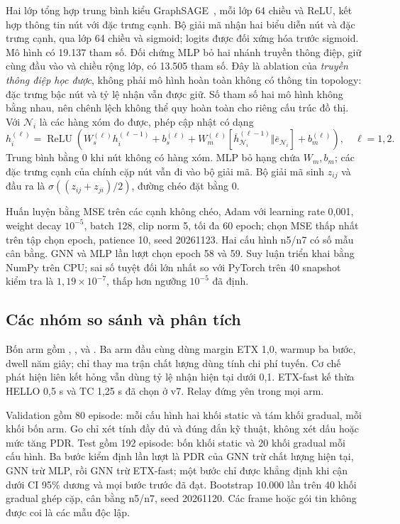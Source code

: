 Hai lớp tổng hợp trung bình kiểu GraphSAGE~\cite{graphsage}, mỗi lớp 64 chiều
và ReLU, kết hợp thông tin nút với đặc trưng cạnh. Bộ giải mã nhận hai biểu
diễn nút và đặc trưng cạnh, qua lớp 64 chiều và sigmoid; logits được đối xứng
hóa trước sigmoid. Mô hình có 19.137 tham số. Đối chứng MLP bỏ hai nhánh truyền
thông điệp, giữ cùng đầu vào và chiều rộng lớp, có 13.505 tham số. Đây là
ablation của \emph{truyền thông điệp học được}, không phải mô hình hoàn toàn
không có thông tin topology: đặc trưng bậc nút và tỷ lệ nhận vẫn được giữ.
Số tham số hai mô hình không bằng nhau, nên chênh lệch không thể quy hoàn
toàn cho riêng cấu trúc đồ thị.
Với $\mathcal N_i$ là các hàng xóm đo được, phép cập nhật có dạng
\begin{equation}
h_i^{(\ell)}=\operatorname{ReLU}\!\left(W_s^{(\ell)}h_i^{(\ell-1)}+b_s^{(\ell)}
+W_m^{(\ell)}\left[\overline{h}_{\mathcal N_i}^{(\ell-1)}\Vert
\overline e_{\mathcal N_i}\right]+b_m^{(\ell)}\right),\quad \ell=1,2.
\end{equation}
Trung bình bằng 0 khi nút không có hàng xóm. MLP bỏ hạng chứa $W_m,b_m$;
các đặc trưng cạnh của chính cặp nút vẫn đi vào bộ giải mã. Bộ giải mã sinh
$z_{ij}$ và đầu ra là $\sigma((z_{ij}+z_{ji})/2)$, đường chéo đặt bằng 0.

Huấn luyện bằng MSE trên các cạnh không chéo, Adam với learning rate 0,001,
weight decay $10^{-5}$, batch 128, clip norm 5, tối đa 60 epoch; chọn MSE thấp
nhất trên tập chọn epoch, patience 10, seed 20261123. Hai cấu hình n5/n7 có
số mẫu cân bằng. GNN và MLP lần lượt chọn epoch 58 và 59. Suy luận triển khai
bằng NumPy trên CPU; sai số tuyệt đối lớn nhất so với PyTorch trên 40 snapshot
kiểm tra là $1{,}19\times10^{-7}$, thấp hơn ngưỡng $10^{-5}$ đã định.

\subsection{Các nhóm so sánh và phân tích}
Bốn arm gồm , ,  và
. Ba arm đầu cùng dùng margin ETX 1,0, warmup ba bước,
dwell năm giây; chỉ thay ma trận chất lượng dùng tính chi phí tuyến. Cơ chế
phát hiện liên kết hỏng vẫn dùng tỷ lệ nhận hiện tại dưới 0,1. ETX-fast kế
thừa HELLO 0,5 s và TC 1,25 s đã chọn ở v7. Relay đứng yên trong mọi arm.

Validation gồm 80 episode: mỗi cấu hình hai khối static và tám khối gradual,
mỗi khối bốn arm. Go chỉ xét tính đầy đủ và đúng đắn kỹ thuật, không xét
dấu hoặc mức tăng PDR. Test gồm 192 episode: bốn khối static và 20 khối gradual
mỗi cấu hình. Ba bước kiểm định lần lượt là PDR của GNN trừ chất lượng hiện
tại, GNN trừ MLP, rồi GNN trừ ETX-fast; một bước chỉ được khẳng định khi cận
dưới CI 95\% dương và mọi bước trước đã đạt. Bootstrap 10.000 lần trên 40 khối
gradual ghép cặp, cân bằng n5/n7, seed 20261120. Các frame hoặc gói tin không
được coi là các mẫu độc lập.

